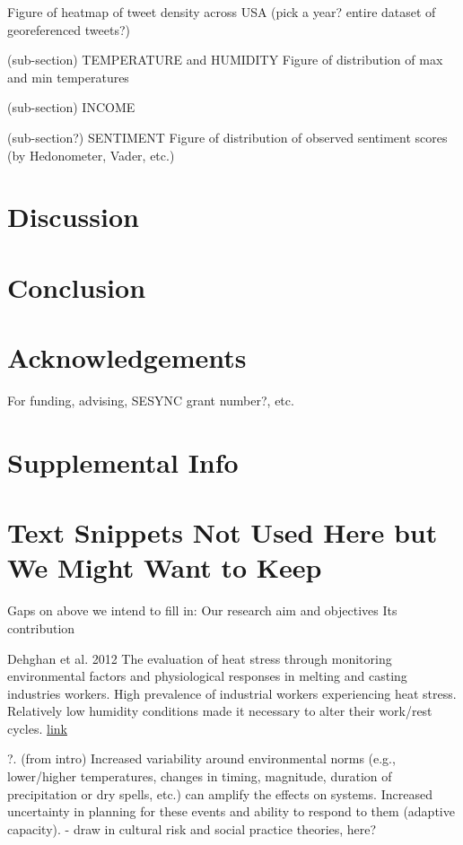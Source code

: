 \documentclass{article}
\begin{document}
Figure of heatmap of tweet density across USA (pick a year? entire dataset of georeferenced tweets?)

(sub-section) TEMPERATURE and HUMIDITY
Figure of distribution of max and min temperatures

(sub-section) INCOME

(sub-section?) SENTIMENT
Figure of distribution of observed sentiment scores (by Hedonometer, Vader, etc.)


\section{Discussion}

\section{Conclusion}

\section{Acknowledgements}
For funding, advising, SESYNC grant number?, etc.

\printbibliography

\section*{Supplemental Info}
\setcounter{table}{0}
\setcounter{figure}{0}
\setcounter{section}{0}
\renewcommand{\thetable}{S\arabic{table}}
\renewcommand{\thefigure}{S\arabic{figure}}
\renewcommand{\thesection}{S\arabic{section}}

\section*{Text Snippets Not Used Here but We Might Want to Keep}
Gaps on above we intend to fill in:
Our research aim and objectives
Its contribution

Dehghan et al. 2012  The evaluation of heat stress through monitoring environmental factors and physiological responses in melting and casting industries workers. High prevalence of industrial workers experiencing heat stress. Relatively low humidity conditions made it necessary to alter their work/rest cycles. \href{http://www.ijehe.org/article.asp?issn=2277-9183;year=2012;volume=1;issue=1;spage=21;epage=21;aulast=Dehghan}{link}

?. (from intro) Increased variability around environmental norms (e.g., lower/higher temperatures, changes in timing, magnitude, duration of precipitation or dry spells, etc.) can amplify the effects on systems. Increased uncertainty in planning for these events and ability to respond to them (adaptive capacity). - draw in cultural risk and social practice theories, here?
\end{document}
